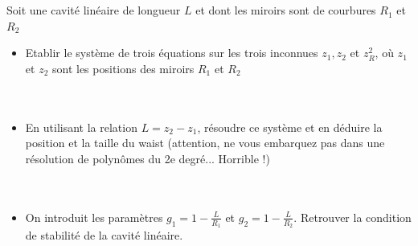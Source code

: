\documentclass[12pt]{article}
\newenvironment{exercice}[2][Exercice]{\begin{trivlist}
\item[\hskip \labelsep {\bfseries #1}\hskip \labelsep {\bfseries #2.}]}{\end{trivlist}}
\begin{document}
\begin{exercice}{3}
\\\\
 Soit une cavité linéaire de longueur $L$ et dont les miroirs sont de courbures $R_1$ et $R_2$
          \begin{itemize}
              \item  Etablir le système de trois équations sur les trois inconnues $z_1, z_2$ et $z_R^2$, où $z_1$ et $z_2$ sont les positions des miroirs $R_1$ et $R_2$
              \\\\\\
              \item  En utilisant la relation $L = z_2 - z_1$, résoudre ce système et en déduire la position et la taille du waist (attention, ne vous embarquez pas dans une résolution de polynômes du 2e degré... Horrible !)
              \\\\\\
              \item  On introduit les paramètres $g_1 = 1-\frac{L}{R_1}$ et $g_2 = 1-\frac{L}{R_2}$. Retrouver la condition de stabilité de la cavité linéaire. 
              \\\\\\
        \end{itemize}
\end{exercice}
\\
\end{document}
